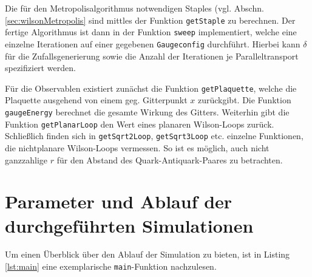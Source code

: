 Die für den Metropolisalgorithmus notwendigen Staples (vgl. Abschn.
\ref{sec:wilsonMetropolis} sind mittles der Funktion \texttt{getStaple} zu berechnen.
Der fertige Algorithmus ist dann in der Funktion \texttt{sweep} implementiert, welche
eine einzelne Iterationen auf einer gegebenen \texttt{Gaugeconfig} durchführt.
Hierbei kann $\delta$ für die Zufallsgenerierung sowie die Anzahl der Iterationen
je Paralleltransport spezifiziert werden.

Für die Observablen existiert zunächst die Funktion \texttt{getPlaquette}, welche
die Plaquette ausgehend von einem geg. Gitterpunkt $x$ zurückgibt. Die Funktion
\texttt{gaugeEnergy} berechnet die gesamte Wirkung des Gitters. Weiterhin gibt
die Funktion \texttt{getPlanarLoop} den Wert eines planaren Wilson-Loops zurück.
Schließlich finden sich in \texttt{getSqrt2Loop}, \texttt{getSqrt3Loop} etc.
einzelne Funktionen, die nichtplanare Wilson-Loops vermessen. So ist es möglich,
auch nicht ganzzahlige $r$ für den Abstand des Quark-Antiquark-Paares zu betrachten.


\section{Parameter und Ablauf der durchgeführten Simulationen}
Um einen Überblick über den Ablauf der Simulation zu bieten, ist in Listing
\ref{lst:main} eine exemplarische \texttt{main}-Funktion nachzulesen.

